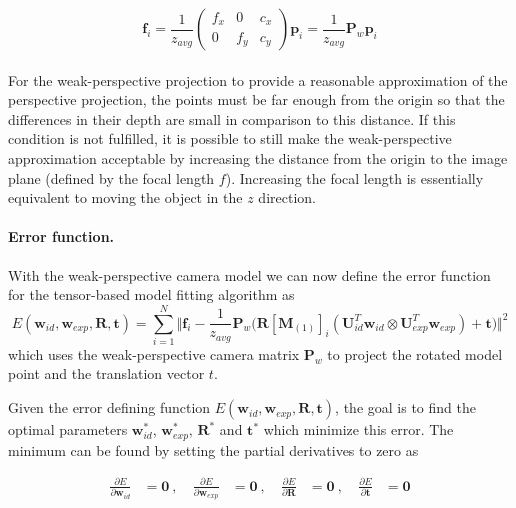 \documentclass[11pt,a4paper]{report}
\begin{document}
\begin{equation}\label{eq:fit9}
 \mathbf{f}_i = \frac{1}{z_{avg}}\begin{pmatrix}f_x&0&c_x\\0&f_y&c_y\end{pmatrix}\mathbf{p}_i
    = \frac{1}{z_{avg}}\mathbf{P}_w\mathbf{p}_i
\end{equation}\\
For the weak-perspective projection to provide a reasonable approximation of the
perspective projection, the points must be far enough from the origin so that
the differences in their depth are small in comparison to this distance. If this condition is not fulfilled, it is
possible to still make the weak-perspective approximation acceptable by
increasing the distance from the origin to the
image plane (defined by the focal length $f$). Increasing the focal length
is essentially equivalent to moving the object in the $z$ direction.


\paragraph{Error function.} With the weak-perspective camera model we can now define the error function for
the tensor-based model fitting algorithm as
\begin{equation}\label{eq:fit10}
E(\mathbf{w}_{id}, \mathbf{w}_{exp}, \mathbf{R}, \mathbf{t}) = \sum_{i=1}^N \Big\Vert\mathbf{f}_i - \frac{1}{z_{avg}}\mathbf{P}_w\Big(\mathbf{R}[\mathbf{M}_{(1)}]_{i}(\mathbf{U}_{id}^T\mathbf{w}_{id} \otimes
\mathbf{U}_{exp}^T\mathbf{w}_{exp}) + \mathbf{t}\Big)\Big\Vert^2
\end{equation}
which uses the weak-perspective camera matrix $\mathbf{P}_w$ to project the
rotated model point and the translation vector $t$. 

Given the error defining function $E(\mathbf{w}_{id}, \mathbf{w}_{exp}, \mathbf{R},
\mathbf{t})$, the goal is to find the optimal parameters $\mathbf{w}_{id}^*$,
$\mathbf{w}_{exp}^*$, $\mathbf{R}^*$ and
$\mathbf{t}^*$ which minimize this
error. The minimum can be found by setting the partial derivatives to zero as

\begin{align}\label{eq:fit11}
\frac{\partial E}{\partial \mathbf{w}_{id}} &= \mathbf{0} \: \mathrm{, } \: & \frac{\partial
  E}{\partial \mathbf{w}_{exp}} &= \mathbf{0}  \: \mathrm{, } \:  & \frac{\partial E}{\partial
  \mathbf{R}} &= \mathbf{0}  \: \mathrm{, } \:  & \frac{\partial E}{\partial \mathbf{t}} &= \mathbf{0}
\end{align}
\end{document}
